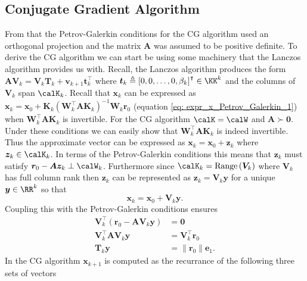 \subsection{Conjugate Gradient Algorithm}\label{Section4.5}

From  that the Petrov-Galerkin conditions for the CG algorithm used an orthogonal projection and the matrix $\bm{A}$ was assumed to be positive definite. To derive the CG algorithm we can start be using some machinery that the Lanczos algorithm provides us with. Recall, the Lanczos algorithm produces the form $\bm{A}\bm{V}_{k} = \bm{V}_{k} \bm{T}_k + \bm{v}_{k+1} \bm{t}_{k}^{\intercal}$ where $\bm{t}_{k} \triangleq \left[ 0,0, \ldots , 0, \beta_k \right]^{\intercal} \in \KK^k$ and the columns of $\bm{V}_{k}$ span $\calK_k$. Recall that $\bm{x}_k$ can be expressed as $\bm{x}_k = \bm{x}_0 + \bm{K}_k \left( \bm{W}_k^{\intercal} \bm{A} \bm{K}_k \right)^{-1} \bm{W}_k \bm{r}_0$ (equation \ref{eq: expr_x_Petrov_Galerkin_1}) when $\bm{W}_k^{\intercal} \bm{A} \bm{K}_k$ is invertible. For the CG algorithm $\calK = \calW$ and $\bm{A} \succ \bm{0}$. Under these conditions we can easily show that $\bm{W}_k^{\intercal} \bm{A} \bm{K}_k$ is indeed invertible. Thus the approximate vector can be expressed as $\bm{x}_k = \bm{x}_0 + \bm{z}_k$ where $\bm{z}_k \in \calK_k$. In terms of the Petrov-Galerkin conditions this means that $\bm{z}_k$ must satisfy $\bm{r}_0 - \bm{A} \bm{z}_k \perp \calW_k$. Furthermore since $\calK_k = \operatorname{Range} \left( \bm{V}_{k} \right)$ where $\bm{V}_{k}$ has full column rank then $\bm{z}_k$ can be represented as $\bm{z}_k = \bm{V}_{k} \bm{y}$ for a unique $\bm{y} \in \RR^k$ so that
\begin{equation} \label{eq: x_eq_Qky}
    \bm{x}_k = \bm{x}_0 + \bm{V}_{k} \bm{y}.
\end{equation}
Coupling this with the Petrov-Galerkin conditions ensures
\begin{align} \label{eq: Tky_eq_normr0e1}
    \bm{V}_{k}^{\intercal} \left( \bm{r}_0 - \bm{A} \bm{V}_{k} \bm{y} \right) & = \bm{0}                        \nonumber   \\
    \bm{V}_{k}^{\intercal} \bm{A} \bm{V}_{k} \bm{y}                           & = \bm{V}_{k}^{\intercal} \bm{r}_0 \nonumber \\
    \bm{T}_k \bm{y}                                                           & = \| \bm{r}_0 \| \bm{e}_1.
\end{align}
In the CG algorithm $\bm{x}_{k+1}$ is computed as the recurrance of the following three sets of vectors
